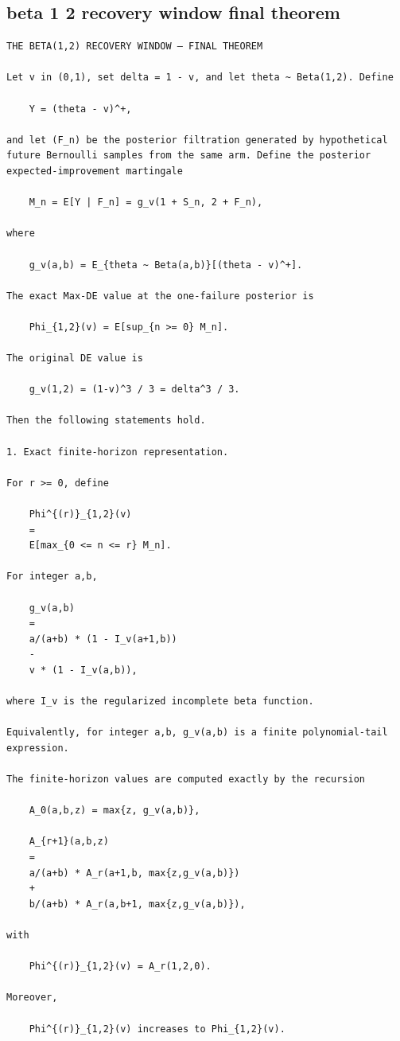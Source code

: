 \subsection{beta 1 2 recovery window final theorem}
\begin{small}
\begin{verbatim}
THE BETA(1,2) RECOVERY WINDOW — FINAL THEOREM

Let v in (0,1), set delta = 1 - v, and let theta ~ Beta(1,2). Define

    Y = (theta - v)^+,

and let (F_n) be the posterior filtration generated by hypothetical future Bernoulli samples from the same arm. Define the posterior expected-improvement martingale

    M_n = E[Y | F_n] = g_v(1 + S_n, 2 + F_n),

where

    g_v(a,b) = E_{theta ~ Beta(a,b)}[(theta - v)^+].

The exact Max-DE value at the one-failure posterior is

    Phi_{1,2}(v) = E[sup_{n >= 0} M_n].

The original DE value is

    g_v(1,2) = (1-v)^3 / 3 = delta^3 / 3.

Then the following statements hold.

1. Exact finite-horizon representation.

For r >= 0, define

    Phi^{(r)}_{1,2}(v)
    =
    E[max_{0 <= n <= r} M_n].

For integer a,b,

    g_v(a,b)
    =
    a/(a+b) * (1 - I_v(a+1,b))
    -
    v * (1 - I_v(a,b)),

where I_v is the regularized incomplete beta function.

Equivalently, for integer a,b, g_v(a,b) is a finite polynomial-tail expression.

The finite-horizon values are computed exactly by the recursion

    A_0(a,b,z) = max{z, g_v(a,b)},

    A_{r+1}(a,b,z)
    =
    a/(a+b) * A_r(a+1,b, max{z,g_v(a,b)})
    +
    b/(a+b) * A_r(a,b+1, max{z,g_v(a,b)}),

with

    Phi^{(r)}_{1,2}(v) = A_r(1,2,0).

Moreover,

    Phi^{(r)}_{1,2}(v) increases to Phi_{1,2}(v).


\end{verbatim}
\end{small}
